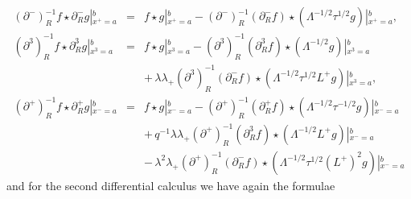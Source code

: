 \documentclass[a4paper,11pt,oneside]{article}
\begin{document}
\begin{eqnarray}
\left( \partial ^{-}\right) _{R}^{-1}f\star \partial _{R}^{-}g\left|
_{x^{+}=a}^{b}\right. &=&f\star g\left| _{x^{+}=a}^{b}\right. -\left(
\partial ^{-}\right) _{R}^{-1}\left( \partial _{R}^{-}f\right) \star \left(
\Lambda ^{-1/2}\tau ^{1/2}g\right) \left| _{x^{+}=a}^{b},\right. \\
\left( \partial ^{3}\right) _{R}^{-1}f\star \partial _{R}^{3}g\left|
_{x^{3}=a}^{b}\right. &=&f\star g\left| _{x^{3}=a}^{b}\right. -\left(
\partial ^{3}\right) _{R}^{-1}\left( \partial _{R}^{3}f\right) \star \left(
\Lambda ^{-1/2}g\right) \left| _{x^{3}=a}^{b}\right.  \nonumber \\
&&+\,\lambda \lambda _{+}\left( \partial ^{3}\right) _{R}^{-1}\left(
\partial _{R}^{-}f\right) \star \left( \Lambda ^{-1/2}\tau
^{1/2}L^{+}g\right) \left| _{x^{3}=a}^{b},\right.  \nonumber \\
\left( \partial ^{+}\right) _{R}^{-1}f\star \partial _{R}^{+}g\left|
_{x^{-}=a}^{b}\right. &=&f\star g\left| _{x^{-}=a}^{b}\right. -\left(
\partial ^{+}\right) _{R}^{-1}\left( \partial _{R}^{+}f\right) \star \left(
\Lambda ^{-1/2}\tau ^{-1/2}g\right) \left| _{x^{-}=a}^{b}\right.  \nonumber
\\
&&+\,q^{-1}\lambda \lambda _{+}\left( \partial ^{+}\right) _{R}^{-1}\left(
\partial _{R}^{3}f\right) \star \left( \Lambda ^{-1/2}L^{+}g\right) \left|
_{x^{-}=a}^{b}\right.  \nonumber \\
&&-\,\lambda ^{2}\lambda _{+}\left( \partial ^{+}\right) _{R}^{-1}\left(
\partial _{R}^{-}f\right) \star \left( \Lambda ^{-1/2}\tau ^{1/2}\left(
L^{+}\right) ^{2}g\right) \left| _{x^{-}=a}^{b}\right.  \nonumber
\end{eqnarray}
and for the second differential calculus we have again the formulae 
\end{document}
